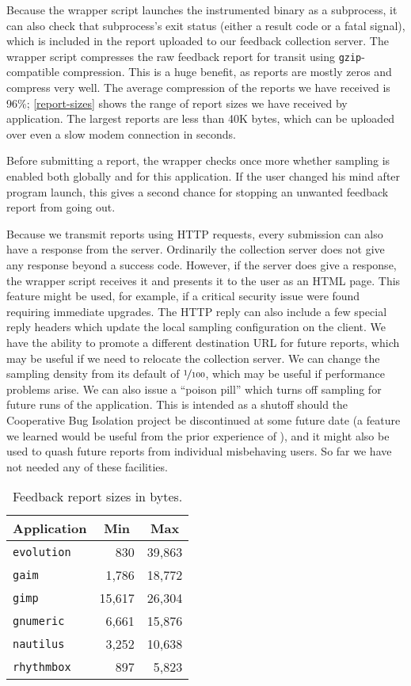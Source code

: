 \documentclass[10pt,twocolumn]{article}
\newcommand{\evolution}{\texttt{evolution}\xspace}
\newcommand{\gaim}{\texttt{gaim}\xspace}
\newcommand{\gimp}{\texttt{gimp}\xspace}
\newcommand{\gnumeric}{\texttt{gnumeric}\xspace}
\newcommand{\nautilus}{\texttt{nautilus}\xspace}
\newcommand{\rhythmbox}{\texttt{rhythmbox}\xspace}
\newcommand{\header}[1]{\multicolumn{1}{c}{\textbf{#1}}}
\begin{document}
Because the wrapper script launches the instrumented binary as a
subprocess, it can also check that subprocess's exit status (either a
result code or a fatal signal), which is included in the report
uploaded to our feedback collection server.
The wrapper script compresses the raw feedback report for transit
using \texttt{gzip}-compatible compression.  This is a huge benefit, as reports
are mostly zeros and compress very well.  The average compression
of the reports we have received is 96\%; \autoref{report-sizes} shows
the range of report sizes we have received by application.  
The largest reports are less than 40K bytes, which can be uploaded
over even a slow modem connection in seconds.

Before submitting a report, the wrapper checks once more whether
sampling is enabled both globally and for this application.  If the
user changed his mind after program launch, this gives a second chance
for stopping an unwanted feedback report from going out.

Because we transmit reports using HTTP requests, every submission
can also have a response from the server.
Ordinarily the collection server does not give any response beyond a
success code.  However, if the server does give a response, the
wrapper script receives it and presents it to the user as an HTML
page.  This feature might be used, for example, if a critical security
issue were found requiring immediate upgrades.  
The HTTP reply can also include a few special reply headers which
update the local sampling configuration on the client.  We have the
ability to promote a different destination URL for future reports,
which may be useful if we need to relocate the collection server.  We
can change the sampling density from its default of $\nicefrac{1}{100}$, which may be
useful if performance problems arise.  We can also issue a ``poison
pill'' which turns off sampling for future runs of the application.
This is intended as a shutoff should the Cooperative Bug
Isolation project be discontinued at some future date (a feature we
learned would be useful from the prior experience of \cite{Elbaum:2003:DISATA}), and it might also
be used to quash future reports from individual misbehaving users.  So
far we have not needed any of these facilities.  

\begin{table}
  \centering
  \begin{tabular}{lrr}
    \header{Application} & \header{Min} & \header{Max} \\ \hline
    \evolution & 830 & 39,863  \\
    \gaim & 1,786 & 18,772  \\
    \gimp & 15,617 & 26,304  \\
    \gnumeric & 6,661 & 15,876  \\
    \nautilus & 3,252 & 10,638  \\
    \rhythmbox & 897 & 5,823 
  \end{tabular}
  \caption{Feedback report sizes in bytes.}
  \label{report-sizes}
\end{table}
\end{document}
